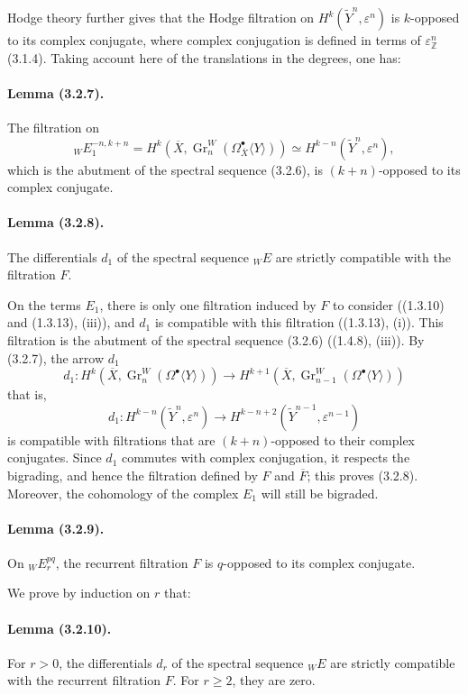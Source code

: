 \documentclass[10pt]{article}
\newcommand{\Z}{\mathbb Z}
\newcommand{\Gr}{\operatorname{Gr}}
\begin{document}
Hodge theory further gives that the Hodge filtration on $H^k(\widetilde Y^n,\varepsilon^n)$ is $k$-opposed to its complex conjugate, where complex conjugation is defined in terms of $\varepsilon_\Z^n$ (3.1.4). Taking account here of the translations in the degrees, one has:

\paragraph{Lemma (3.2.7).} The filtration on
\[
{}_W E_1^{-n,k+n}
=H^k(\overline X,\Gr_n^W(\Omega_{\overline X}^{\bullet}\langle Y\rangle))
\simeq H^{k-n}(\widetilde Y^n,\varepsilon^n),
\]
which is the abutment of the spectral sequence (3.2.6), is $(k+n)$-opposed to its complex conjugate.

\paragraph{Lemma (3.2.8).} The differentials $d_1$ of the spectral sequence ${}_WE$ are strictly compatible with the filtration $F$.

On the terms $E_1$, there is only one filtration induced by $F$ to consider ((1.3.10) and (1.3.13), (iii)), and $d_1$ is compatible with this filtration ((1.3.13), (i)). This filtration is the abutment of the spectral sequence (3.2.6) ((1.4.8), (iii)). By (3.2.7), the arrow $d_1$
\[
d_1:H^k(\overline X,\Gr_n^W(\Omega^\bullet\langle Y\rangle))
\longrightarrow
H^{k+1}(\overline X,\Gr_{n-1}^W(\Omega^\bullet\langle Y\rangle))
\]
that is,
\[
\tag{3.2.8.1}
d_1:H^{k-n}(\widetilde Y^n,\varepsilon^n)
\longrightarrow
H^{k-n+2}(\widetilde Y^{n-1},\varepsilon^{n-1})
\]
is compatible with filtrations that are $(k+n)$-opposed to their complex conjugates. Since $d_1$ commutes with complex conjugation, it respects the bigrading, and hence the filtration defined by $F$ and $\overline F$; this proves (3.2.8). Moreover, the cohomology of the complex $E_1$ will still be bigraded.

\paragraph{Lemma (3.2.9).} On ${}_WE_r^{pq}$, the recurrent filtration $F$ is $q$-opposed to its complex conjugate.

We prove by induction on $r$ that:

\paragraph{Lemma (3.2.10).} For $r>0$, the differentials $d_r$ of the spectral sequence ${}_WE$ are strictly compatible with the recurrent filtration $F$. For $r\ge2$, they are zero.
\end{document}
